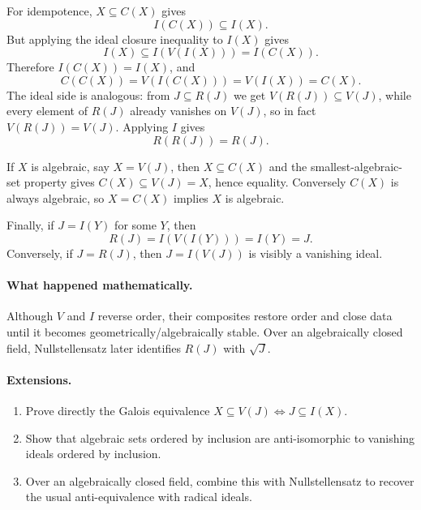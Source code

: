 For idempotence, \(X\subseteq C(X)\) gives
\[
I(C(X))\subseteq I(X).
\]
But applying the ideal closure inequality to \(I(X)\) gives
\[
I(X)\subseteq I(V(I(X)))=I(C(X)).
\]
Therefore \(I(C(X))=I(X)\), and
\[
C(C(X))=V(I(C(X)))=V(I(X))=C(X).
\]
The ideal side is analogous: from \(J\subseteq R(J)\) we get
\(V(R(J))\subseteq V(J)\), while every element of \(R(J)\) already vanishes on \(V(J)\),
so in fact \(V(R(J))=V(J)\).  Applying \(I\) gives
\[
R(R(J))=R(J).
\]

If \(X\) is algebraic, say \(X=V(J)\), then \(X\subseteq C(X)\) and the smallest-algebraic-
set property gives \(C(X)\subseteq V(J)=X\), hence equality.  Conversely \(C(X)\) is always
algebraic, so \(X=C(X)\) implies \(X\) is algebraic.

Finally, if \(J=I(Y)\) for some \(Y\), then
\[
R(J)=I(V(I(Y)))=I(Y)=J.
\]
Conversely, if \(J=R(J)\), then \(J=I(V(J))\) is visibly a vanishing ideal.

\paragraph{What happened mathematically.}
Although \(V\) and \(I\) reverse order, their composites restore order and close data until
it becomes geometrically/algebraically stable.  Over an algebraically closed field,
Nullstellensatz later identifies \(R(J)\) with \(\sqrt J\).

\paragraph{Extensions.}
\begin{enumerate}
\item Prove directly the Galois equivalence
\(X\subseteq V(J)\iff J\subseteq I(X)\).
\item Show that algebraic sets ordered by inclusion are anti-isomorphic to vanishing ideals
ordered by inclusion.
\item Over an algebraically closed field, combine this with Nullstellensatz to recover the
usual anti-equivalence with radical ideals.
\end{enumerate}
\fi
